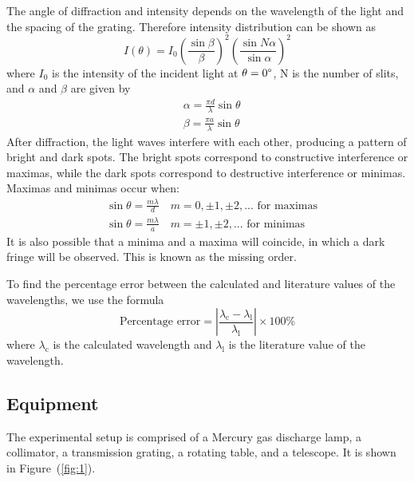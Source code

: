 \documentclass[10pt]{article}
\begin{document}
The angle of diffraction and intensity depends on the wavelength of the light and the spacing of the grating. Therefore intensity distribution can be shown as
\begin{equation}
  I(\theta) = I_0 \left( \frac{\sin \beta}{\beta} \right)^2 \left( \frac{\sin N \alpha}{\sin \alpha} \right)^2
\end{equation}
where $I_0$ is the intensity of the incident light at $\theta = 0\degree$, N is the number of slits, and $\alpha$ and $\beta$ are given by
\begin{align}
  &\alpha = \frac{\pi d}{\lambda} \sin \theta \\
  &\beta = \frac{\pi a}{\lambda} \sin \theta
\end{align}
After diffraction, the light waves interfere with each other, producing a pattern of bright and dark spots. The bright spots correspond to constructive interference or maximas, while the dark spots correspond to destructive interference or minimas. Maximas and minimas occur when:
\begin{align}
  &\sin \theta = \frac{m \lambda}{d} \quad m = 0, \pm 1, \pm 2, ... \text{ for maximas} \\
  &\sin \theta = \frac{m \lambda}{a} \quad m = \pm 1, \pm 2, ... \text{ for minimas}
\end{align}
It is also possible that a minima and a maxima will coincide, in which a dark fringe will be observed. This is known as the missing order.

To find the percentage error between the calculated and literature values of the wavelengths, we use the formula
\begin{equation}
  \text{Percentage error} = \left| \frac{\lambda_{\text{c}} - \lambda_{\text{l}}}{\lambda_{\text{l}}} \right| \times 100 \%
  \label{eq:percentage-error}
\end{equation}
where $\lambda_{\text{c}}$ is the calculated wavelength and $\lambda_{\text{l}}$ is the literature value of the wavelength.

\subsection*{Equipment}

The experimental setup is comprised of a Mercury gas discharge lamp, a collimator, a transmission grating, a rotating table, and a telescope. It is shown in Figure~(\ref{fig:1}). 
\end{document}
